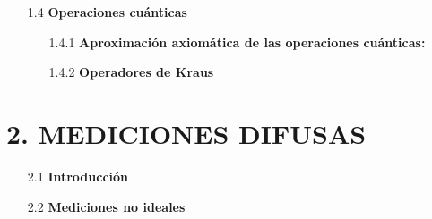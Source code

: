 \documentclass[12pt,oneside]{book}\raggedbottom{} %
\begin{document}
\begin{sloppypar}
{{\begin{itemize}
\begin{itemize}
  
  
  \item[1.3.2]\textbf{Operadores POVM} 
  
\end{itemize}
\item[1.4]\textbf{Operaciones cuánticas}
\begin{itemize}
  \item[1.4.1] \textbf{Aproximación axiomática de las operaciones cuánticas:} %
  \item[1.4.2] \textbf{Operadores de Kraus }
  
  
\end{itemize}
\end{itemize}

\section*{2. MEDICIONES DIFUSAS}
  \begin{itemize}
    \item[2.1]\textbf{Introducción}



  \item[2.2]\textbf{Mediciones no ideales}  


\end{itemize}}}
\end{sloppypar}
\end{document}
